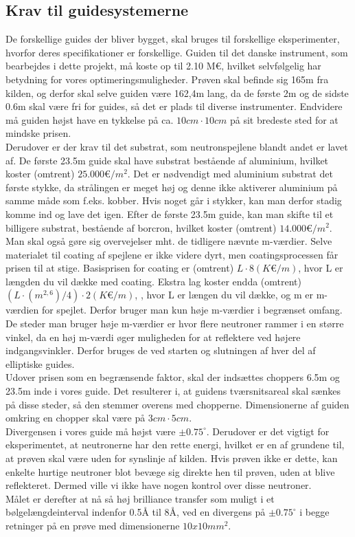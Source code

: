 \documentclass[12pt,oneside,a4paper]{article}
\begin{document}
{{{{{\subsection{Krav til guidesystemerne}
De forskellige guides der bliver bygget, skal bruges til forskellige eksperimenter, hvorfor deres specifikationer er forskellige. Guiden til det danske instrument, som bearbejdes i dette projekt, må koste op til 2.10 M€, hvilket selvfølgelig har betydning for vores optimeringsmuligheder. Prøven skal befinde sig 165m fra kilden, og derfor skal selve guiden være 162,4m lang, da de første 2m og de sidste 0.6m skal være fri for guides, så det er plads til diverse instrumenter. Endvidere må guiden højst have en tykkelse på ca. $10cm \cdot 10cm$ på sit bredeste sted for at mindske prisen.
\\
Derudover er der krav til det substrat, som neutronspejlene blandt andet er lavet af. De første 23.5m guide skal have substrat bestående af aluminium, hvilket koster (omtrent) $25.000 \text{€}/m^2$. Det er nødvendigt med aluminium substrat det første stykke, da strålingen er meget høj og denne ikke aktiverer aluminium på samme måde som f.eks. kobber. Hvis noget går i stykker, kan man derfor stadig komme ind og lave det igen. Efter de første 23.5m guide, kan man skifte til et billigere substrat, bestående af borcron, hvilket koster (omtrent) $14.000 \text{€}/m^2$.
\\
Man skal også gøre sig overvejelser mht. de tidligere nævnte m-værdier. Selve materialet til coating af spejlene er ikke videre dyrt, men coatingsprocessen får prisen til at stige. Basisprisen for coating er (omtrent) $L\cdot8(K\text{€}/m)$, hvor L er længden du vil dække med coating. Ekstra lag koster endda (omtrent) $(L\cdot(m^{2,6})/4)\cdot2(K\text{€}/m)$, , hvor L er længen du vil dække, og m er m-værdien for spejlet. Derfor bruger man kun høje m-værdier i begrænset omfang. De steder man bruger høje m-værdier er hvor flere neutroner rammer i en større vinkel, da en høj m-værdi øger muligheden for at reflektere ved højere indgangsvinkler. Derfor bruges de ved starten og slutningen af hver del af elliptiske guides.
\\
Udover prisen som en begrænsende faktor, skal der indsættes choppers 6.5m og 23.5m inde i vores guide. Det resulterer i, at guidens tværsnitsareal skal sænkes på disse steder, så den stemmer overens med chopperne. Dimensionerne af guiden omkring en chopper skal være på $3cm\cdot5cm$. 
\\
Divergensen i vores guide må højst være $\pm0.75^\circ$. Derudover er det vigtigt for eksperimentet, at neutronerne har den rette energi, hvilket er en af grundene til, at prøven skal være uden for synslinje af kilden. Hvis prøven ikke er dette, kan enkelte hurtige neutroner blot  bevæge sig direkte hen til prøven, uden at blive reflekteret. Dermed ville vi ikke have nogen kontrol over disse neutroner.
\\
Målet er derefter at nå så høj brilliance transfer som muligt i et bølgelængdeinterval indenfor 0.5Å til 8Å, ved en divergens på $\pm0.75^\circ$ i begge retninger på en prøve med dimensionerne $10x10 mm^2$.

}}}}}
\end{document}

